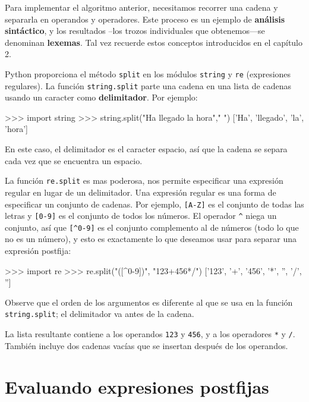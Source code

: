   

Para implementar el algoritmo anterior, necesitamos recorrer una cadena
y separarla en operandos y operadores. Este proceso es un ejemplo
de \textbf{análisis sintáctico}, y los resultados –los trozos individuales
que obtenemos—se denominan \textbf{lexemas}. Tal vez recuerde estos
conceptos introducidos en el capítulo 2.

Python proporciona el método \texttt{split} en los módulos \texttt{string}
y \texttt{re} (expresiones regulares). La función \texttt{string.split}
parte una cadena en una lista de cadenas usando un caracter como \textbf{delimitador}.
Por ejemplo:

\beforeverb 
\begin{pyconcode}
>>> import string
>>> string.split("Ha llegado la hora"," ")
['Ha', 'llegado', 'la', 'hora']
\end{pyconcode}
\afterverb En este caso, el delimitador es el caracter espacio, así
que la cadena se separa cada vez que se encuentra un espacio.

La función \texttt{re.split} es mas poderosa, nos permite especificar
una expresión regular en lugar de un delimitador. Una expresión regular
es una forma de especificar un conjunto de cadenas. Por ejemplo, \verb+[A-Z]+
es el conjunto de todas las letras y \verb+[0-9]+ es el conjunto
de todos los números. El operador \verb+^+ niega un conjunto, así
que \verb+[^0-9]+ es el conjunto complemento al de números (todo
lo que no es un número), y esto es exactamente lo que deseamos usar
para separar una expresión postfija:

\beforeverb 
\begin{pyconcode}
>>> import re
>>> re.split("([^0-9])", "123+456*/")
['123', '+', '456', '*', '', '/', '']
\end{pyconcode}
\afterverb Observe que el orden de los argumentos es diferente al
que se usa en la función \texttt{string.split}; el delimitador va
antes de la cadena.

La lista resultante contiene a los operandos \texttt{123} y \texttt{456},
y a los operadores \texttt{{*}} y \texttt{/}. También incluye dos
cadenas vacías que se insertan después de los operandos.

\section{Evaluando expresiones postfijas}

